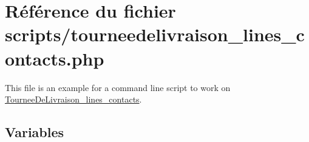 \hypertarget{tourneedelivraison__lines__contacts_8php}{}\section{Référence du fichier scripts/tourneedelivraison\+\_\+lines\+\_\+contacts.php}
\label{tourneedelivraison__lines__contacts_8php}


This file is an example for a command line script to work on \hyperlink{classTourneeDeLivraison__lines__contacts}{Tournee\+De\+Livraison\+\_\+lines\+\_\+contacts}.  


\subsection*{Variables}
